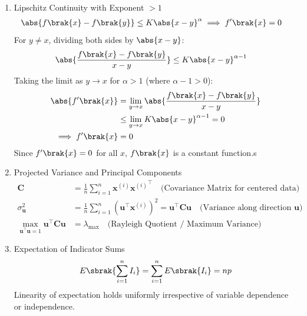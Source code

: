\begin{enumerate}[label=\thesubsection.\arabic*, ref=\thesubsection.\theenumi]
\item Lipschitz Continuity with Exponent $> 1$
\begin{align}
	\abs{f\brak{x} - f\brak{y}} &\le K \abs{x - y}^\alpha \implies f'\brak{x} = 0 \label{eq:DA2025-lipschitz}
\end{align}
\solution
For $y \ne x$, dividing both sides by $\abs{x - y}$:
\begin{align}
	\abs{\frac{f\brak{x} - f\brak{y}}{x - y}} &\le K \abs{x - y}^{\alpha - 1}
\end{align}
Taking the limit as $y \to x$ for $\alpha > 1$ (where $\alpha - 1 > 0$):
\begin{align}
	\abs{f'\brak{x}} &= \lim_{y \to x} \abs{\frac{f\brak{x} - f\brak{y}}{x - y}}
	\\
	&\le \lim_{y \to x} K \abs{x - y}^{\alpha - 1} = 0
	\\
	\implies f'\brak{x} &= 0
\end{align}
Since $f'\brak{x} = 0$ for all $x$, $f\brak{x}$ is a constant function.s
	\item Projected Variance and Principal Components
	\begin{align}
		\mathbf{C} &= \frac{1}{n} \sum_{i=1}^n \mathbf{x}^{(i)} {\mathbf{x}^{(i)}}^\top \quad \text{(Covariance Matrix for centered data)} \label{eq:DA2025-cov_centered}
		\\
		\sigma_{\mathbf{u}}^2 &= \frac{1}{n} \sum_{i=1}^n \left(\mathbf{u}^\top \mathbf{x}^{(i)}\right)^2 = \mathbf{u}^\top \mathbf{C} \mathbf{u} \quad \text{(Variance along direction $\mathbf{u}$)} \label{eq:DA2025-proj_variance}
		\\
		\max_{\mathbf{u}^\top \mathbf{u} = 1} \mathbf{u}^\top \mathbf{C} \mathbf{u} &= \lambda_{\max} \quad \text{(Rayleigh Quotient / Maximum Variance)} \label{eq:DA2025-pca_max_var}
	\end{align}
	\item Expectation of Indicator Sums
	\begin{align}
		E\sbrak{\sum_{i=1}^n I_i} = \sum_{i=1}^n E\sbrak{I_i} = np \label{eq:DA2025-linearity}
	\end{align}
	\solution
	Linearity of expectation holds uniformly irrespective of variable dependence or independence.
	

\end{enumerate}
